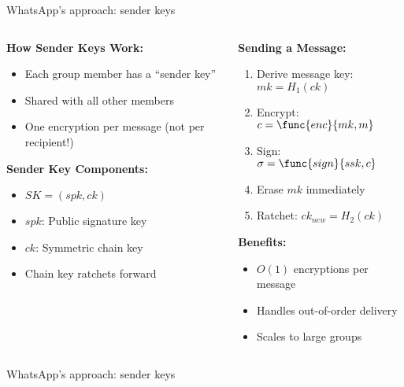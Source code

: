 \documentclass[aspectratio=169, lualatex, handout]{beamer}
\begin{document}
\begin{frame}{WhatsApp's approach: sender keys}
	\begin{columns}[c]
		\begin{column}{0.5\textwidth}
			\textbf{How Sender Keys Work:}
			\begin{itemize}
				\item Each group member has a ``sender key''
				\item Shared with all other members
				\item One encryption per message (not per recipient!)
			\end{itemize}
			\textbf{Sender Key Components:}
			\begin{itemize}
				\item $SK = (spk, ck)$
				\item $spk$: Public signature key
				\item $ck$: Symmetric chain key
				\item Chain key ratchets forward
			\end{itemize}
		\end{column}
		\begin{column}{0.5\textwidth}
			\textbf{Sending a Message:}
			\begin{enumerate}
				\item Derive message key: $mk = H_1(ck)$
				\item Encrypt: $c = \func{enc}{mk, m}$
				\item Sign: $\sigma = \func{sign}{ssk, c}$
				\item Erase $mk$ immediately
				\item Ratchet: $ck_{new} = H_2(ck)$
			\end{enumerate}
			\textbf{Benefits:}
			\begin{itemize}
				\item $O(1)$ encryptions per message
				\item Handles out-of-order delivery
				\item Scales to large groups
			\end{itemize}
		\end{column}
	\end{columns}
\end{frame}

\begin{frame}{WhatsApp's approach: sender keys}
\end{frame}
\end{document}
